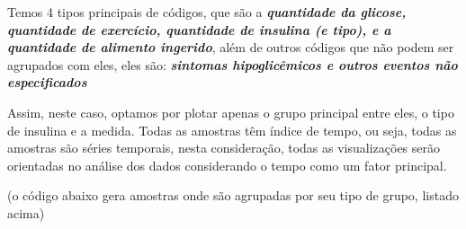 \documentclass[11pt]{article}
\begin{document}
    
    Temos 4 tipos principais de códigos, que são a \textbf{\emph{quantidade
da glicose, quantidade de exercício, quantidade de insulina (e tipo), e
a quantidade de alimento ingerido}}, além de outros códigos que não
podem ser agrupados com eles, eles são: \textbf{\emph{sintomas
hipoglicêmicos e outros eventos não especificados}}

Assim, neste caso, optamos por plotar apenas o grupo principal entre
eles, o tipo de insulina e a medida. Todas as amostras têm índice de
tempo, ou seja, todas as amostras são séries temporais, nesta
consideração, todas as visualizações serão orientadas no análise dos
dados considerando o tempo como um fator principal.

(o código abaixo gera amostras onde são agrupadas por seu tipo de grupo,
listado acima)
\end{document}

